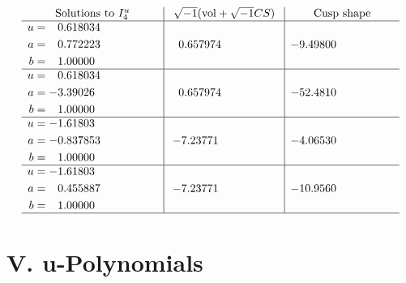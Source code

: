 \documentclass[1p]{elsarticle_modified}
\theoremstyle{definition}
\newcommand{\I}{\sqrt{-1}}
\begin{document}
$$\begin{array}{c|c|c}  
\text{Solutions to }I^u_{4}& \I (\text{vol} + \sqrt{-1}CS) & \text{Cusp shape}\\
 \hline 
\begin{aligned}
u &= \phantom{-}0.618034\phantom{ +0.000000I} \\
a &= \phantom{-}0.772223\phantom{ +0.000000I} \\
b &= \phantom{-}1.00000\phantom{ +0.000000I}\end{aligned}
 & \phantom{-}0.657974\phantom{ +0.000000I} & -9.49800\phantom{ +0.000000I} \\ \hline\begin{aligned}
u &= \phantom{-}0.618034\phantom{ +0.000000I} \\
a &= -3.39026\phantom{ +0.000000I} \\
b &= \phantom{-}1.00000\phantom{ +0.000000I}\end{aligned}
 & \phantom{-}0.657974\phantom{ +0.000000I} & -52.4810\phantom{ +0.000000I} \\ \hline\begin{aligned}
u &= -1.61803\phantom{ +0.000000I} \\
a &= -0.837853\phantom{ +0.000000I} \\
b &= \phantom{-}1.00000\phantom{ +0.000000I}\end{aligned}
 & -7.23771\phantom{ +0.000000I} & -4.06530\phantom{ +0.000000I} \\ \hline\begin{aligned}
u &= -1.61803\phantom{ +0.000000I} \\
a &= \phantom{-}0.455887\phantom{ +0.000000I} \\
b &= \phantom{-}1.00000\phantom{ +0.000000I}\end{aligned}
 & -7.23771\phantom{ +0.000000I} & -10.9560\phantom{ +0.000000I}\\
 \hline 
 \end{array}$$\newpage
\newpage\renewcommand{\arraystretch}{1}
\centering \section*{ V. u-Polynomials}
\end{document}
